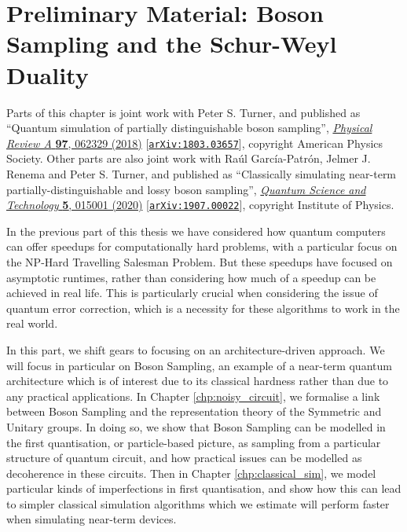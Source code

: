 \chapter{Preliminary Material: Boson Sampling and the Schur-Weyl Duality}
\label{chp:preliminary_bs}

Parts of this chapter is joint work with Peter S. Turner, and published as ``Quantum simulation of partially distinguishable boson sampling'', \href{https://link.aps.org/doi/10.1103/PhysRevA.97.062329}{\textit{Physical Review A} \textbf{97}, 062329 (2018)} [{\tt \href{https://arxiv.org/abs/1803.03657}{arXiv:1803.03657}}], copyright American Physics Society. Other parts are also joint work with Ra\'ul Garc\'ia-Patr\'on, Jelmer J. Renema and Peter S. Turner, and published as ``Classically simulating near-term partially-distinguishable and lossy boson sampling'', \href{https://iopscience.iop.org/article/10.1088/2058-9565/ab5555}{\textit{Quantum Science and Technology} \textbf{5}, 015001 (2020)} [{\tt \href{https://arxiv.org/abs/1907.00022}{arXiv:1907.00022}}], copyright Institute of Physics.

In the previous part of this thesis we have considered how quantum computers can offer speedups for computationally hard problems, with a particular focus on the NP-Hard Travelling Salesman Problem. But these speedups have focused on asymptotic runtimes, rather than considering how much of a speedup can be achieved in real life. This is particularly crucial when considering the issue of quantum error correction, which is a necessity for these algorithms to work in the real world.

In this part, we shift gears to focusing on an architecture-driven approach. We will focus in particular on Boson Sampling, an example of a near-term quantum architecture which is of interest due to its classical hardness rather than due to any practical applications. In Chapter \ref{chp:noisy_circuit}, we formalise a link between Boson Sampling and the representation theory of the Symmetric and Unitary groups. In doing so, we show that Boson Sampling can be modelled in the first quantisation, or particle-based picture, as sampling from a particular structure of quantum circuit, and how practical issues can be modelled as decoherence in these circuits. Then in Chapter \ref{chp:classical_sim}, we model particular kinds of imperfections in first quantisation, and show how this can lead to simpler classical simulation algorithms which we estimate will perform faster when simulating near-term devices.

